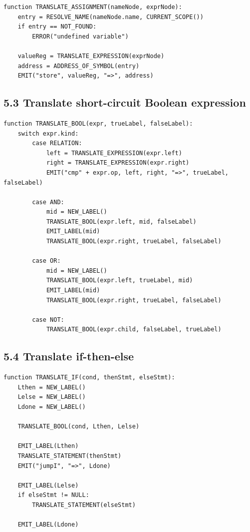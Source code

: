 \documentclass[10pt,letterpaper]{article}
\begin{document}
\begin{verbatim}
function TRANSLATE_ASSIGNMENT(nameNode, exprNode):
    entry = RESOLVE_NAME(nameNode.name, CURRENT_SCOPE())
    if entry == NOT_FOUND:
        ERROR("undefined variable")

    valueReg = TRANSLATE_EXPRESSION(exprNode)
    address = ADDRESS_OF_SYMBOL(entry)
    EMIT("store", valueReg, "=>", address)
\end{verbatim}

\subsection*{5.3 Translate short-circuit Boolean expression}

\begin{verbatim}
function TRANSLATE_BOOL(expr, trueLabel, falseLabel):
    switch expr.kind:
        case RELATION:
            left = TRANSLATE_EXPRESSION(expr.left)
            right = TRANSLATE_EXPRESSION(expr.right)
            EMIT("cmp" + expr.op, left, right, "=>", trueLabel, falseLabel)

        case AND:
            mid = NEW_LABEL()
            TRANSLATE_BOOL(expr.left, mid, falseLabel)
            EMIT_LABEL(mid)
            TRANSLATE_BOOL(expr.right, trueLabel, falseLabel)

        case OR:
            mid = NEW_LABEL()
            TRANSLATE_BOOL(expr.left, trueLabel, mid)
            EMIT_LABEL(mid)
            TRANSLATE_BOOL(expr.right, trueLabel, falseLabel)

        case NOT:
            TRANSLATE_BOOL(expr.child, falseLabel, trueLabel)
\end{verbatim}

\subsection*{5.4 Translate if-then-else}

\begin{verbatim}
function TRANSLATE_IF(cond, thenStmt, elseStmt):
    Lthen = NEW_LABEL()
    Lelse = NEW_LABEL()
    Ldone = NEW_LABEL()

    TRANSLATE_BOOL(cond, Lthen, Lelse)

    EMIT_LABEL(Lthen)
    TRANSLATE_STATEMENT(thenStmt)
    EMIT("jumpI", "=>", Ldone)

    EMIT_LABEL(Lelse)
    if elseStmt != NULL:
        TRANSLATE_STATEMENT(elseStmt)

    EMIT_LABEL(Ldone)
\end{verbatim}
\end{document}
